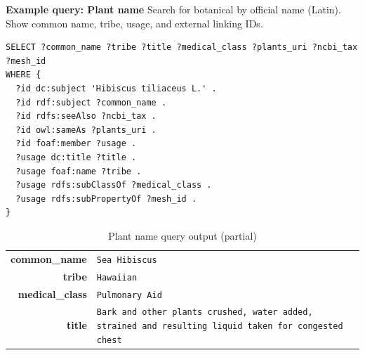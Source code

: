 \documentclass{acm_proc_article-sp}
\newcommand{\head}[1]{\textnormal{\textbf{#1}}}
\begin{document}
\textbf{Example query: Plant name}
Search for botanical by official name (Latin). Show common name, tribe, usage, and external linking IDs.
\begin{lstlisting}
SELECT ?common_name ?tribe ?title ?medical_class ?plants_uri ?ncbi_tax ?mesh_id
WHERE {
  ?id dc:subject 'Hibiscus tiliaceus L.' .
  ?id rdf:subject ?common_name . 
  ?id rdfs:seeAlso ?ncbi_tax . 
  ?id owl:sameAs ?plants_uri . 
  ?id foaf:member ?usage . 
  ?usage dc:title ?title . 
  ?usage foaf:name ?tribe . 
  ?usage rdfs:subClassOf ?medical_class . 
  ?usage rdfs:subPropertyOf ?mesh_id .
}
\end{lstlisting}

\begin{table}[h]
	\centering
	\caption{Plant name query output (partial)}
	\begin{tabular}{|r|L|}
		\hline
		\head{common\_name} & \texttt{Sea Hibiscus}  \\
		\head{tribe} & \texttt{Hawaiian} \\
		\head{medical\_class} & \texttt{Pulmonary Aid} \\
		\head{title} & \texttt{Bark and other plants crushed, water added, strained and resulting liquid taken for congested chest} \\
		\hline
	\end{tabular}
\end{table}
\end{document}
